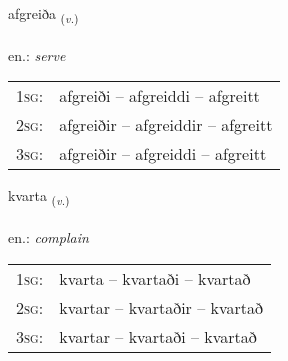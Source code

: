 \documentclass[frontgrid, backgrid]{flacards}\usepackage[]{graphicx}\usepackage[]{xcolor}
\begin{document}
\renewcommand{\flhead}{\vskip5pt \fboxsep=0pt {\small\bfseries\footnotesize Sagnorð | Verb}}
\renewcommand{\fcfoot}{\vskip5pt \fboxsep=0pt \hspace{2pt}{\small\bfseries\footnotesize 2K}}

\renewcommand{\blhead}{\vskip5pt {\small\bfseries\footnotesize Sagnorð | Verb }}
\renewcommand{\bcfoot}{\vskip5pt \hspace{2pt}{\small\bfseries\footnotesize 2K}}


{afgreiða \small{\textsubscript{(\textit{v.})}} \\[1ex] %
\textphonetic{[avkreiða]} \\
en.: \emph{serve} \\  [2ex]
\renewcommand*{\arraystretch}{0.8}
\begin{tabular}{p{1cm}l}
\textsc{1sg}: & afgreiði -- afgreiddi -- afgreitt \\ 
\textsc{2sg}: & afgreiðir -- afgreiddir -- afgreitt \\ 
\textsc{3sg}: & afgreiðir -- afgreiddi -- afgreitt \\ 
\end{tabular}
}

\renewcommand{\flhead}{\vskip5pt \fboxsep=0pt {\small\bfseries\footnotesize Sagnorð | Verb}}
\renewcommand{\fcfoot}{\vskip5pt \fboxsep=0pt \hspace{2pt}{\small\bfseries\footnotesize 2K}}

\renewcommand{\blhead}{\vskip5pt {\small\bfseries\footnotesize Sagnorð | Verb }}
\renewcommand{\bcfoot}{\vskip5pt \hspace{2pt}{\small\bfseries\footnotesize 2K}}


{kvarta \small{\textsubscript{(\textit{v.})}} \\[1ex] %
\textphonetic{[kʰvar̥ta]} \\
en.: \emph{complain} \\  [2ex]
\renewcommand*{\arraystretch}{0.8}
\begin{tabular}{p{1cm}l}
\textsc{1sg}: & kvarta -- kvartaði -- kvartað \\ 
\textsc{2sg}: & kvartar -- kvartaðir -- kvartað \\ 
\textsc{3sg}: & kvartar -- kvartaði -- kvartað \\ 
\end{tabular}
}
\end{document}

